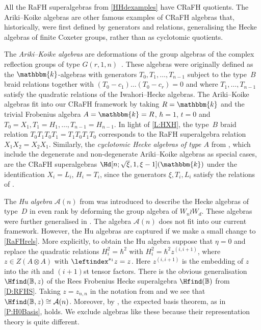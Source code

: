 \documentclass[a4paper,11pt]{amsart}
\numberwithin{equation}{subsection}
\theoremstyle{definition}
\theoremstyle{theorem}
\theoremstyle{remark}
\newcommand\CA{\mathcal{A}}
\newcommand\Sym{W}
\newcommand\kk{\mathbbm{k}}
\newcommand\RR{R}
\newcommand{\Bo}{\mathbb{B}}
\begin{document}
All the RaFH superalgebras from \autoref{HHdexamples} have CRaFH quotients.
The Ariki--Koike algebras are other famous examples of CRaFH algebras
that, historically, were first defined by generators and relations, generalising the Hecke algebras of finite Coxeter groups, rather than as cyclotomic quotients.

 \begin{Example}\label{Ex:CRaFH}
The \emph{Ariki--Koike algebras} are deformations of the
      group algebras of the complex reflection groups of type
      $G(r,1,n)$~\cite{AK,BM:cyc}. These algebras were originally
      defined as the $\kk$-algebras with generators
     $T_0,T_1,\dots,T_{n-1}$ subject to the type~$B$ braid relations
      together with $(T_0-c_1)\dots(T_0-c_r)=0$ and where
      $T_1,\dots,T_{n-1}$ satisfy the quadratic relations of the
      Iwahori--Hecke algebras. The Ariki--Koike algebras fit into our
      CRaFH framework by taking $\RR=\kk$ and the trivial Frobenius algebra $A=\kk=\RR$,
      $\hbar=1$, $t=0$ and $T_0=X_1, T_1=H_1,\dots,T_{n-1}=H_{n-1}$.
      In light of \autoref{L:HXH}, the type~$B$ braid relation
      $T_0T_1T_0T_1=T_1T_0T_1T_0$ corresponds to the RaFH superalgebra
      relation $X_1X_2=X_2X_1$. Similarly, the
      \emph{cyclotomic Hecke algebras of type $A$} from \cite{HuMathas:SeminormalQuiver}, which include the degenerate and non-degenerate Ariki--Koike algebras as
      special cases, are the CRaFH superalgebras
     $\Hd[n;\sqrt{\xi},1,\xi-1](\kk)$ under the
      identification $X_i=L_i$, $H_i=T_i$, since the generators $\xi,
      T_i, L_i$ satisfy the relations of \cite[Definition~2.1]{HuMathas:SeminormalQuiver}.
      \end{Example}
      \begin{Remark}
     The \emph{Hu algebra} $\CA(n)$ from
     \cite{Hu:TypeDMorita}  was introduced to describe the Hecke
     algebras of type~$D$ in even rank by deforming the group algebra of
     $\Sym_n\wr \Sym_d$. These algebras were further generalised in
     \cite[\S4.1]{CJNakanoXiang}. The algebra  $\CA(n)$ does not
     fit into our current framework. However, the Hu algebras are
     captured  if we make a small change to
     \autoref{RaFHrels}. More explicitly, to obtain the Hu algebra
     suppose that $\eta=0$ and replace the quadratic relations
     $H_i^2=\hbar^2$ with $H_i^2=\hbar^2 z^{(i,i+1)}$, where $z\in
     Z(A\otimes A)$ with $\leftindex^{s_1}z=z$. Here $z^{(i,i+1)}$ is
     the embedding of $z$ into the $i$th and $(i+1)$st tensor factors.
      There is the obvious generalisation $\Hfind(\Bo,z)$ of the Rees
     Frobenius Hecke superalgebra $\Hfind(\Bo)$ from \autoref{D:RFHS}.
     Taking $z=z_{n,n}$ in the notation from \cite{Hu:TypeDMorita} and
     \cite{CJNakanoXiang} we see that $\Hfind(\Bo,z)\cong\CA(n)$.
     Moreover, by \cite[\S4.1]{CJNakanoXiang}, the expected basis
     theorem, as in \autoref{P:H0Basis}, holds. We
     exclude algebras like these because their representation theory is
     quite different.
\end{Remark}
\end{document}
